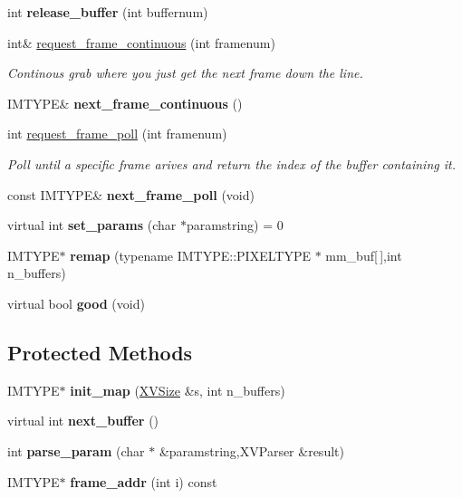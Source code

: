 \begin{CompactItemize}
\item 
int {\bf release\_\-buffer} (int buffernum)
\item 
int\& \hyperlink{class_XVVideo_a9}{request\_\-frame\_\-continuous} (int framenum)
\begin{CompactList}\small\item\em Continous grab where you just get the next frame down the line.\item\end{CompactList}\item 
IMTYPE\& {\bf next\_\-frame\_\-continuous} ()
\item 
int \hyperlink{class_XVVideo_a11}{request\_\-frame\_\-poll} (int framenum)
\begin{CompactList}\small\item\em Poll until a specific frame arives and return the index of the buffer containing it.\item\end{CompactList}\item 
const IMTYPE\& {\bf next\_\-frame\_\-poll} (void)
\item 
\label{XVVideo_a13}
\hypertarget{class_XVVideo_a13}{
virtual int {\bf set\_\-params} (char $\ast$paramstring) = 0}

\item 
\label{XVVideo_a14}
\hypertarget{class_XVVideo_a14}{
IMTYPE$\ast$ {\bf remap} (typename IMTYPE::PIXELTYPE $\ast$ mm\_\-buf\mbox{[}$\,$\mbox{]},int n\_\-buffers)}

\item 
virtual bool {\bf good} (void)
\end{CompactItemize}
\subsection*{Protected Methods}
\begin{CompactItemize}
\item 
\label{XVVideo_b0}
\hypertarget{class_XVVideo_b0}{
IMTYPE$\ast$ {\bf init\_\-map} (\hyperlink{class_XVSize}{XVSize} \&s, int n\_\-buffers)}

\item 
virtual int {\bf next\_\-buffer} ()
\item 
\label{XVVideo_b2}
\hypertarget{class_XVVideo_b2}{
int {\bf parse\_\-param} (char $\ast$ \&paramstring,XVParser \&result)}

\item 
IMTYPE$\ast$ {\bf frame\_\-addr} (int i) const
\end{CompactItemize}
